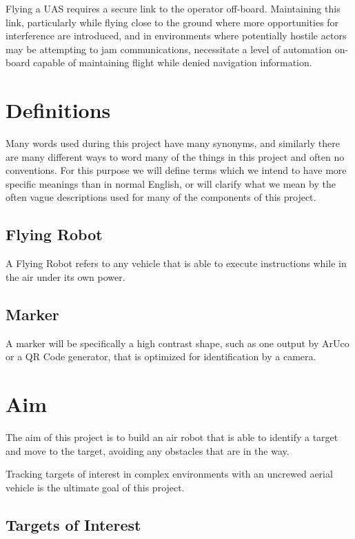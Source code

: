 \documentclass[]{report}
\begin{document}
Flying a UAS requires a secure link to the operator off-board. Maintaining this link, particularly while flying close to the ground where more opportunities for interference are introduced, and in environments where potentially hostile actors may be attempting to jam communications, necessitate a level of automation on-board capable of maintaining flight while denied navigation information.

\section{Definitions}

Many words used during this project have many synonyms, and similarly there are many different ways to word many of the things in this project and often no conventions. For this purpose we will define terms which we intend to have more specific meanings than in normal English, or will clarify what we mean by the often vague descriptions used for many of the components of this project.

\subsection{Flying Robot}

A Flying Robot refers to any vehicle that is able to execute instructions while in the air under its own power.

\subsection{Marker}

A marker will be specifically a high contrast shape, such as one output by ArUco or a QR Code generator, that is optimized for identification by a camera.

\section{Aim}

The aim of this project is to build an air robot that is able to identify a target and move to the target, avoiding any obstacles that are in the way. 

Tracking targets of interest in complex environments with an uncrewed aerial vehicle is the ultimate goal of this project. 

\subsection{Targets of Interest}
\end{document}

